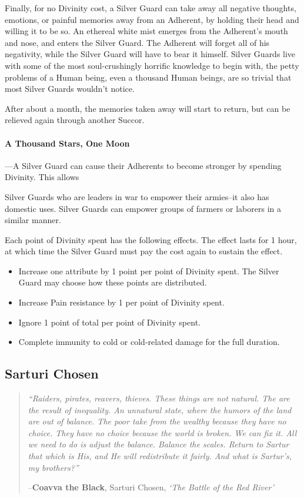 \documentclass[oneside,11pt,english]{book}
\begin{document}
Finally, for no Divinity cost, a Silver Guard can take away all negative thoughts, emotions, or 
painful memories away from an Adherent, by holding their head and willing it to be so. An 
ethereal white mist emerges from the Adherent's mouth and nose, and enters the Silver Guard. 
The Adherent will forget all of his negativity, while the Silver Guard will have to bear it himself. 
Silver Guards live with some of the most soul-crushingly horrific knowledge to begin with, the 
petty problems of a Human being, even a thousand Human beings, are so trivial that most Silver 
Guards wouldn't notice. 

After about a month, the memories taken away will start to return, but can be relieved again 
through another Succor. 

\paragraph{A Thousand Stars, One Moon}
---\quad A Silver Guard can cause their Adherents to become stronger by spending Divinity. This allows 

Silver Guards who are leaders in war to empower their armies--it also has domestic uses. Silver 
Guards can empower groups of farmers or laborers in a similar manner. 

Each point of Divinity spent has the following effects. The effect lasts for 1 hour, at which time 
the Silver Guard must pay the cost again to sustain the effect. 
\begin{itemize}
\item Increase one attribute by 1 point per point of Divinity spent. The Silver Guard may 
choose how these points are distributed. 
\item Increase Pain resistance by 1 per point of Divinity spent. 
\item Ignore 1 point of total  per point of Divinity spent. 
\item Complete immunity to cold or cold-related damage for the full duration. 
\end{itemize}
\subsection{Sarturi Chosen}\label{sec:sarturi-chosen}
\begin{quotation}
	{\emph{“Raiders, pirates, reavers, thieves. These things are not natural. The are the result of inequality. An unnatural state, where the humors of the land are out of balance. The poor take from the wealthy because they have no choice. They have no choice because the world is broken. We can fix it. All we need to do is adjust the balance. Balance the scales. Return to Sartur that which is His, and He will redistribute it fairly. And what is Sartur’s, my brothers?”}

\hfill--\textbf{Coavva the Black}, Sarturi Chosen, \textit{‘The Battle of the Red River’}}
\end{quotation}
\end{document}

